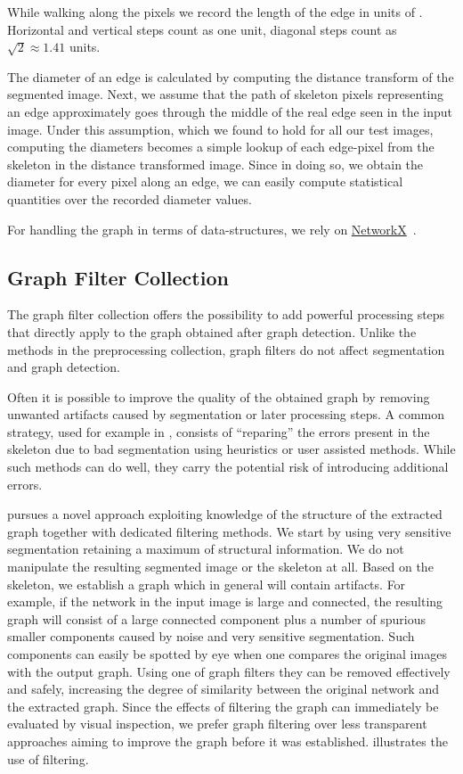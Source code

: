 		While walking along the pixels we record the length of the edge in units of \si{\pixel}. Horizontal and vertical steps count as one unit, diagonal steps count as $\sqrt 2\approx 1.41$ units.

		The diameter of an edge is calculated by computing the distance transform of the segmented image. Next, we assume that the path of skeleton pixels representing an edge approximately goes through the middle of the real edge seen in the input image. Under this assumption, which we found to hold for all our test images, computing the diameters becomes a simple lookup of each edge-pixel from the skeleton in the distance transformed image. Since in doing so, we obtain the diameter for every pixel along an edge, we can easily compute statistical quantities over the recorded diameter values.

		For handling the graph in terms of data-structures, we rely on \href{https://networkx.github.io/documentation/latest/index.html}{NetworkX}~\cite{networkx}.

	\subsection{Graph Filter Collection}

		The graph filter collection offers the possibility to add powerful processing steps that directly apply to the graph obtained after graph detection. Unlike the methods in the preprocessing collection, graph filters do not affect segmentation and graph detection.

		Often it is possible to improve the quality of the obtained graph by removing unwanted artifacts caused by segmentation or later processing steps. A common strategy, used for example in \cite{baumgarten2010detection, baumgarten2012computational}, consists of ``reparing'' the errors present in the skeleton due to bad segmentation using heuristics or user assisted methods. While such methods can do well, they carry the potential risk of introducing additional errors. 

		\NEFI pursues a novel approach exploiting knowledge of the structure of the extracted graph together with dedicated filtering methods. We start by using very sensitive segmentation retaining a maximum of structural information. We do not manipulate the resulting segmented image or the skeleton at all. Based on the skeleton, we establish a graph which in general will contain artifacts. For example, if the network in the input image is large and connected, the resulting graph will consist of a large connected component plus a number of spurious smaller components caused by noise and very sensitive segmentation. Such components can easily be spotted by eye when one compares the original images with the output graph. Using one of \NEFIs graph filters they can be removed effectively and safely, increasing the degree of similarity between the original network and the extracted graph. Since the effects of filtering the graph can immediately be evaluated by visual inspection, we prefer graph filtering over less transparent approaches aiming to improve the graph before it was established.  illustrates the use of filtering.

